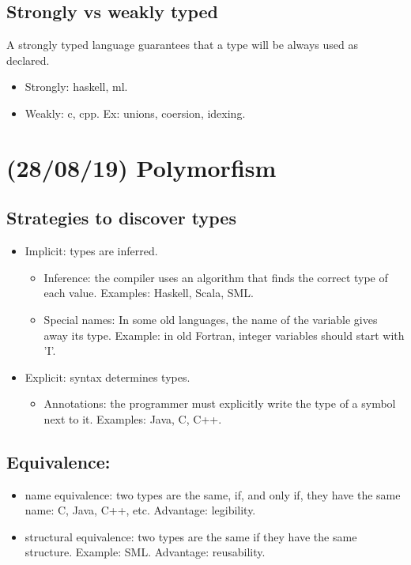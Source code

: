 \documentclass[11pt]{article}
\begin{document}
\subsection{Strongly vs weakly typed}
\label{sec:orgf97a8ba}
A strongly typed language guarantees that a type will be always used as declared.

\begin{itemize}
\item Strongly: haskell, ml.
\item Weakly: c, cpp. Ex: unions, coersion, idexing.
\end{itemize}

\section{(28/08/19) Polymorfism}
\label{sec:orgcc71427}
\subsection{Strategies to discover types}
\label{sec:orgdd2ad50}
\begin{itemize}
\item Implicit: types are inferred.
\begin{itemize}
\item Inference: the compiler uses an algorithm that finds the correct type of
each value. Examples: Haskell, Scala, SML.
\item Special names: In some old languages, the name of the variable gives away
its type. Example: in old Fortran, integer variables should start with 'I'.
\end{itemize}
\item Explicit: syntax determines types.
\begin{itemize}
\item Annotations: the programmer must explicitly write the type of a symbol
next to it. Examples: Java, C, C++.
\end{itemize}
\end{itemize}

\subsection{Equivalence:}
\label{sec:orgc26b02f}
\begin{itemize}
\item name equivalence: two types are the same, if, and only if, they have the
same name: C, Java, C++, etc. Advantage: legibility.
\item structural equivalence: two types are the same if they have the same
structure. Example: SML. Advantage: reusability.
\end{itemize}
\end{document}
